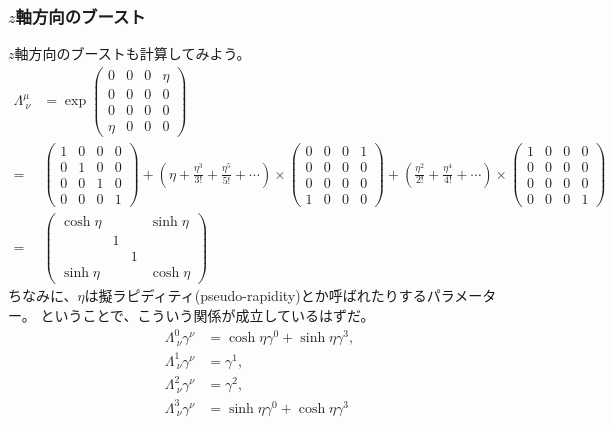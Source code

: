 \documentclass[10pt,a4paper]{jarticle}
\begin{document}
\subsubsection{$z$軸方向のブースト}
$z$軸方向のブーストも計算してみよう。
\begin{align}
\Lambda^{\mu}_{~\nu}
&=
\exp\left(\begin{array}{cccc}
0 & 0 & 0 & \eta \\
0 & 0 & 0 & 0 \\
0 & 0 & 0 & 0 \\
\eta & 0 & 0 & 0
\end{array}\right) \nonumber\\
%
=&
\left(\begin{array}{cccc}
1 & 0 & 0 & 0 \\
0 & 1 & 0 & 0 \\
0 & 0 & 1 & 0 \\
0 & 0 & 0 & 1
\end{array}
\right)
+
\left( \eta + \frac{\eta^3}{3!} + \frac{\eta^5}{5!} + \cdots \right) \times
\left(
\begin{array}{cccc}
0 & 0 & 0 & 1 \\
0 & 0 & 0 & 0 \\
0 & 0 & 0 & 0 \\
1 & 0 & 0 & 0
\end{array}
\right)
+
\left( \frac{\eta^2}{2!} + \frac{\eta^4}{4!} + \cdots \right) \times
\left(\begin{array}{cccc}
1 & 0 & 0 & 0 \\
0 & 0 & 0 & 0 \\
0 & 0 & 0 & 0 \\
0 & 0 & 0 & 1
\end{array}
\right)
\nonumber\\
%
=&
\left(\begin{array}{cccc}
\cosh\eta &&& \sinh\eta \\
& 1 &&\\
& & 1 &\\
\sinh\eta &&& \cosh\eta
\end{array}\right)
\end{align}
ちなみに、$\eta$は擬ラピディティ(pseudo-rapidity)とか呼ばれたりするパラメーター。
ということで、こういう関係が成立しているはずだ。
\begin{align}
\Lambda^0_{~\nu} \gamma^\nu &= \cosh\eta \gamma^0 + \sinh\eta \gamma^3, \label{eq:boost gamma 0} \\
\Lambda^1_{~\nu} \gamma^\nu &= \gamma^1, \label{eq:boost gamma 1}\\
\Lambda^2_{~\nu} \gamma^\nu &= \gamma^2, \label{eq:boost gamma 2}\\
\Lambda^3_{~\nu} \gamma^\nu &= \sinh\eta \gamma^0 + \cosh\eta \gamma^3 \label{eq:boost gamma 3}
\end{align}
\end{document}

